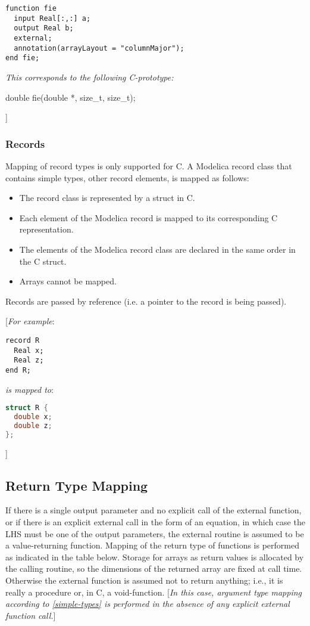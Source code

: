 \begin{lstlisting}[language=modelica]
function fie
  input Real[:,:] a;
  output Real b;
  external;
  annotation(arrayLayout = "columnMajor");
end fie;
\end{lstlisting}
\emph{This corresponds to the following C-prototype:}

double fie(double *, size\_t, size\_t);

{]}

\subsubsection{Records}

Mapping of record types is only supported for C. A Modelica record class
that contains simple types, other record elements, is mapped as follows:

\begin{itemize}
\item
  The record class is represented by a struct in C.
\item
  Each element of the Modelica record is mapped to its corresponding C
  representation.
\item
  The elements of the Modelica record class are declared in the same
  order in the C struct.
\item
  Arrays cannot be mapped.
\end{itemize}

Records are passed by reference (i.e. a pointer to the record is being
passed).

{[}\emph{For example}:

\begin{lstlisting}[language=modelica]
record R
  Real x;
  Real z;
end R;
\end{lstlisting}
\emph{is mapped to}:
\begin{lstlisting}[language=C]
struct R {
  double x;
  double z;
};
\end{lstlisting}

{]}

\subsection{Return Type Mapping}

If there is a single output parameter and no explicit call of the
external function, or if there is an explicit external call in the form
of an equation, in which case the LHS must be one of the output
parameters, the external routine is assumed to be a value-returning
function. Mapping of the return type of functions is performed as
indicated in the table below. Storage for arrays as return values is
allocated by the calling routine, so the dimensions of the returned
array are fixed at call time. Otherwise the external function is assumed
not to return anything; i.e., it is really a procedure or, in C, a
void-function. {[}\emph{In this case, argument type mapping according to
\autoref{simple-types} is performed in the absence of any explicit
external function call.}{]}

